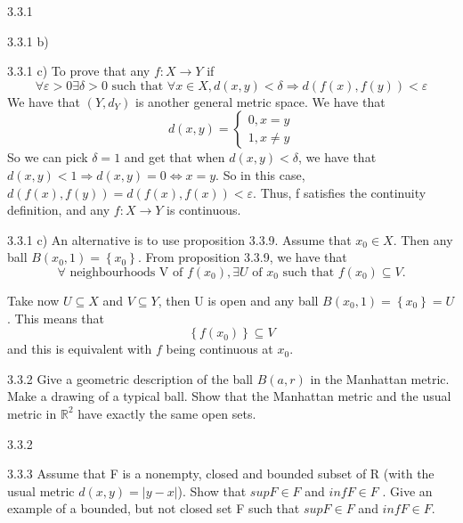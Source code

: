 \documentclass[a4paper,norsk]{article}
\renewcommand{\epsilon}{\varepsilon}
\begin{document}
\begin{oppgavebox}{3.3.1}{}
\begin{proofbox}{3.3.1 b)}{}
\end{proofbox}

\begin{proofbox}{3.3.1 c)}{}
  To prove that any $ f : X \rightarrow Y $ if
  \[
      \forall \epsilon > 0 \exists \delta > 0 \text{ such that } \forall x \in X, d(x, y) < \delta \Rightarrow d(f(x), f(y) ) < \epsilon 
  \]
   We have that $ \left( Y, d_Y \right)  $ is another general metric space. We have that 
   \[
       d(x, y) = \begin{cases}
       0, x=y\\
       1, x\neq y
       \end{cases}
   \]
   So we can pick $ \delta = 1 $ and get that when $ d(x, y) < \delta $, we have that $ d(x, y) < 1 \Rightarrow d(x,y) = 0 \iff x=y $. So in this case,
   $ d( f(x), f(y)) = d( f(x), f(x)) < \epsilon  $. Thus, f satisfies the continuity definition, and any $ f: X\rightarrow Y $ is continuous.
   
\end{proofbox}

\begin{proofbox}{3.3.1 c)}{}
  An alternative is to use proposition 3.3.9. Assume that $ x_0 \in X $. Then any ball $ B \left( x_0, 1 \right) = \left\{ x_0 \right\}  $. From proposition 3.3.9, we have that 
  \[
      \forall \text{ neighbourhoods V of } f(x_0), \exists U \text{ of } x_0 \text{ such that } f(x_0) \subseteq V.
  \]   

  Take now $ U \subseteq X $ and $ V \subseteq Y $, then U is open and any ball $ B \left( x_0, 1 \right) = \left\{ x_0 \right\} =U  $. This means that 
  \[
      \left\{ f(x_0) \right\} \subseteq V
  \]
  and this is equivalent with $ f $ being continuous at $ x_0 $.  
\end{proofbox}
\end{oppgavebox}

\begin{oppgavebox}{3.3.2}{}
Give a geometric description of the ball $ B \left( a, r \right)  $ in the Manhattan metric. Make a drawing of a typical ball. Show that the Manhattan metric and the usual metric in $ \mathbb{R}^2 $ have exactly the same open sets.

\begin{proofbox}{3.3.2}{}
  
\end{proofbox}
\end{oppgavebox}

\begin{oppgavebox}{3.3.3}{}
Assume that F is a nonempty, closed and bounded subset of R (with the usual metric $d(x, y) = \left| y - x \right| $). Show that $sup F \in  F$ and $inf F \in  F$ . Give an example of a bounded, but not closed set F such that $supF \in  F$ and $inf F \in  F$.
\end{oppgavebox}
\end{document}
